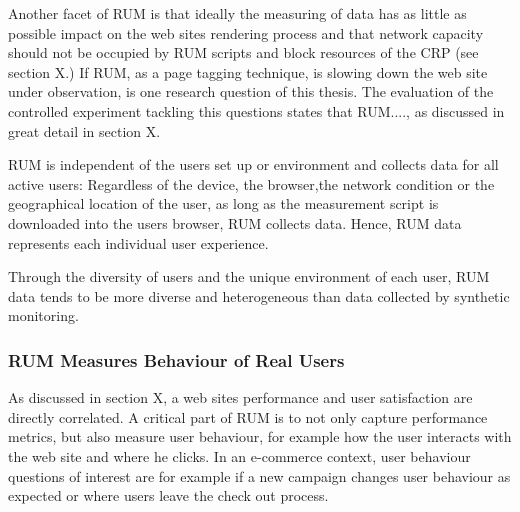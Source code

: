 Another facet of RUM is that ideally the measuring of data has as little as possible impact on the web sites rendering process and that network capacity should not be occupied by RUM scripts and block resources of the CRP (see section X.) %
If RUM, as a page tagging technique, is slowing down the web site under observation, is one research question of this thesis.
The evaluation of the controlled experiment tackling this questions states that RUM...., as discussed in great detail in section X. %



RUM is independent of the users set up or environment and collects data for all active users:
Regardless of the device, the browser,the network condition or the geographical location of the user, as long as the measurement script is downloaded into the users browser, RUM collects data.%
Hence, RUM data represents each individual user experience. %

Through the diversity of users and the unique environment of each user,  RUM data tends to be more diverse and heterogeneous than data collected by synthetic monitoring. %



\subsubsection{RUM Measures Behaviour of Real Users}



As discussed in section X, a web sites performance and user satisfaction are directly correlated.
A critical part of RUM is to not only capture performance metrics, but also measure user behaviour, for example how the user interacts with the web site and where he clicks. %
In an e-commerce context, user behaviour questions of interest are for example if a new campaign changes user behaviour as expected or where users leave the check out process. %

